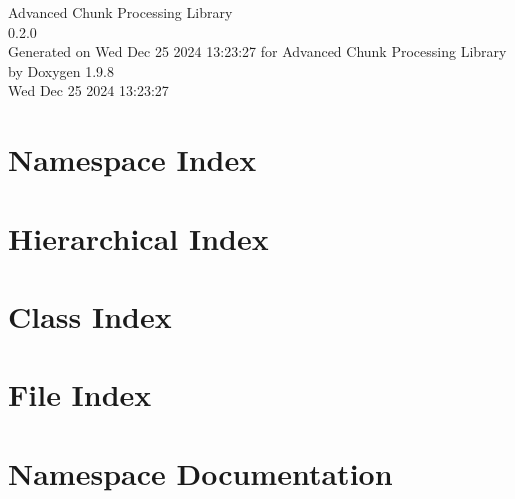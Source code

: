 \documentclass[twoside]{book}
\newcommand{\+}{\discretionary{\mbox{\scriptsize$\hookleftarrow$}}{}{}}
\newcommand{\clearemptydoublepage}{%
    \newpage{\pagestyle{empty}\cleardoublepage}%
  }
\begin{document}
  \raggedbottom
    \hypersetup{pageanchor=false,
                bookmarksnumbered=true,
                pdfencoding=unicode
               }
  \begin{titlepage}
  \vspace*{7cm}
  \begin{center}%
  {\Large Advanced Chunk Processing Library}\\
  [1ex]\large 0.\+2.\+0 \\
  \vspace*{1cm}
  {\large Generated on Wed Dec 25 2024 13\+:23\+:27 for Advanced Chunk Processing Library by Doxygen 1.9.8}\\
    \vspace*{0.5cm}
    {\small Wed Dec 25 2024 13:23:27}
  \end{center}
  \end{titlepage}
  \clearemptydoublepage
  \tableofcontents
  \clearemptydoublepage
  \hypersetup{pageanchor=true}

\chapter{Namespace Index}

\chapter{Hierarchical Index}

\chapter{Class Index}

\chapter{File Index}

\chapter{Namespace Documentation}
















\end{document}
